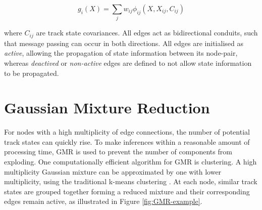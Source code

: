 \begin{equation}
g_i(X) = \sum_{j} w_{ij}\phi_{ij}(X, X_{ij}, C_{ij})
\label{eqn:gaussian-mixture}
\end{equation}

where $C_{ij}$ are track state covariances. All edges act as bidirectional conduits, such that message passing can occur in both directions. All edges are initialised as \textit{active}, allowing the propagation of state information between its node-pair, whereas \textit{deactived} or \textit{non-active} edges are defined to not allow state information to be propagated. 






\section{Gaussian Mixture Reduction}
\label{section-GMR}

For nodes with a high multiplicity of edge connections, the number of potential track states can quickly rise. To make inferences within a reasonable amount of processing time, GMR is used to prevent the number of components from exploding. One computationally efficient algorithm for GMR is clustering. A high multiplicity Gaussian mixture can be approximated by one with lower multiplicity, using the traditional k-means clustering \cite{kmeans}. At each node, similar track states are grouped together forming a reduced mixture and their corresponding edges remain active, as illustrated in Figure \ref{fig:GMR-example}. 


